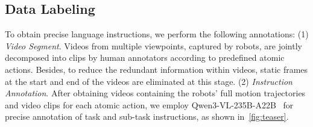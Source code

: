 










\subsection{Data Labeling}
To obtain precise language instructions, we perform the following annotations: 
% 
(1) \textit{Video Segment}.
Videos from multiple viewpoints, captured by robots, are jointly decomposed into clips by human annotators according to predefined atomic actions. 
Besides, to reduce the redundant information within videos, static frames at the start and end of the videos are eliminated at this stage.
% 
(2) \textit{Instruction Annotation}. 
After obtaining videos containing the robots' full motion trajectories and video clips for each atomic action, we employ Qwen3-VL-235B-A22B~\cite{bai2025qwen2} for precise annotation of task and sub-task instructions, as shown in~\cref{fig:teaser}.




